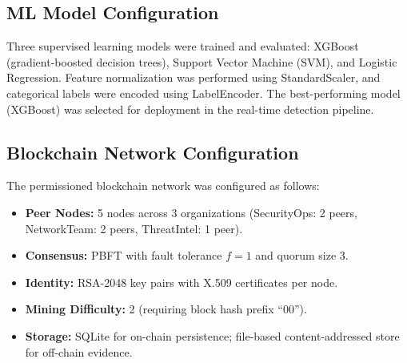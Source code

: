 \documentclass[conference]{IEEEtran}
\begin{document}
\subsection{ML Model Configuration}
Three supervised learning models were trained and evaluated: XGBoost (gradient-boosted decision trees), Support Vector Machine (SVM), and Logistic Regression. Feature normalization was performed using StandardScaler, and categorical labels were encoded using LabelEncoder. The best-performing model (XGBoost) was selected for deployment in the real-time detection pipeline.

\subsection{Blockchain Network Configuration}
The permissioned blockchain network was configured as follows:
\begin{itemize}
    \item \textbf{Peer Nodes:} 5 nodes across 3 organizations (SecurityOps: 2 peers, NetworkTeam: 2 peers, ThreatIntel: 1 peer).
    \item \textbf{Consensus:} PBFT with fault tolerance $f = 1$ and quorum size 3.
    \item \textbf{Identity:} RSA-2048 key pairs with X.509 certificates per node.
    \item \textbf{Mining Difficulty:} 2 (requiring block hash prefix ``00'').
    \item \textbf{Storage:} SQLite for on-chain persistence; file-based content-addressed store for off-chain evidence.
\end{itemize}
\end{document}
